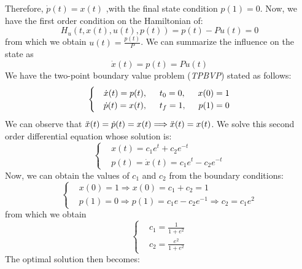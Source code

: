 Therefore, $ \dot{p}(t) =x(t)$ ,with the final state condition $ p(1) = 0 $. Now, we have the first order condition on the Hamiltonian of:
\begin{equation}
    H_u(t, x(t), u(t), p(t)) = p(t) -Pu(t) = 0
\end{equation}
from which we obtain $ u(t) = \frac{p(t)}{P}$. We can summarize the influence on the state as 
\begin{equation}
    \dot{x}(t) = p(t) = Pu(t)
\end{equation}
We have the two-point boundary value problem (\emph{TPBVP}) stated as follows:
\begin{equation}
    \begin{cases}
        &\dot{x}(t) = p(t), \hspace{0.5cm} t_0 = 0, \hspace{0.5cm} x(0) =1\\
        &\dot{p}(t) = x(t), \hspace{0.5cm} t_f = 1, \hspace{0.5cm} p(1) = 0\\
    \end{cases}
\end{equation}
We can observe that $\Ddot{x}(t) = \dot{p}(t) = x(t)  \Longrightarrow \Ddot{x}(t) = x(t)$. We solve this second order differential equation whose solution is:
\begin{equation}
    \begin{cases}
        &x(t) = c_1 e^t + c_2 e^{-t} \\
        &p(t) = \dot{x}(t) = c_1 e^t - c_2 e^{-t}
    \end{cases}
\end{equation}
Now, we can obtain the values of $c_1$ and $c_2 $ from the boundary conditions:
\begin{equation}
    \begin{cases}
        &x(0) = 1 \Longrightarrow x(0) = c_1 +c_2 = 1\\
        &p(1) = 0 \Longrightarrow p(1) = c_1 e - c_2 e^{-1} \Longrightarrow c_2 = c_1 e^2
    \end{cases}
\end{equation}
from which we obtain
\begin{equation}
    \begin{cases}
        &c_1 = \frac{1}{1 + e^2}\\
        &c_2 = \frac{e^2}{1+e^2}
    \end{cases}
\end{equation}
The optimal solution then becomes:
